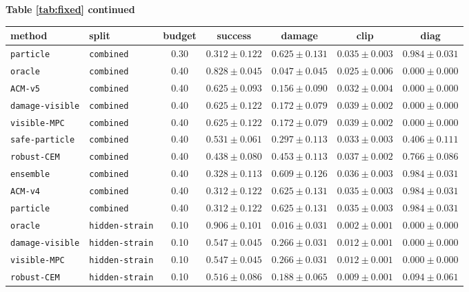 \documentclass{article}
\begin{document}
\begin{center}
\textbf{Table \ref{tab:fixed} continued}\\[0.4ex]
\begin{tabular}{llccccc}
\toprule
method & split & budget & success & damage & clip & diag \\
\midrule
\texttt{particle} & \texttt{combined} & 0.30 & $0.312 \pm 0.122$ & $0.625 \pm 0.131$ & $0.035 \pm 0.003$ & $0.984 \pm 0.031$ \\
\texttt{oracle} & \texttt{combined} & 0.40 & $0.828 \pm 0.045$ & $0.047 \pm 0.045$ & $0.025 \pm 0.006$ & $0.000 \pm 0.000$ \\
\texttt{ACM-v5} & \texttt{combined} & 0.40 & $0.625 \pm 0.093$ & $0.156 \pm 0.090$ & $0.032 \pm 0.004$ & $0.000 \pm 0.000$ \\
\texttt{damage-visible} & \texttt{combined} & 0.40 & $0.625 \pm 0.122$ & $0.172 \pm 0.079$ & $0.039 \pm 0.002$ & $0.000 \pm 0.000$ \\
\texttt{visible-MPC} & \texttt{combined} & 0.40 & $0.625 \pm 0.122$ & $0.172 \pm 0.079$ & $0.039 \pm 0.002$ & $0.000 \pm 0.000$ \\
\texttt{safe-particle} & \texttt{combined} & 0.40 & $0.531 \pm 0.061$ & $0.297 \pm 0.113$ & $0.033 \pm 0.003$ & $0.406 \pm 0.111$ \\
\texttt{robust-CEM} & \texttt{combined} & 0.40 & $0.438 \pm 0.080$ & $0.453 \pm 0.113$ & $0.037 \pm 0.002$ & $0.766 \pm 0.086$ \\
\texttt{ensemble} & \texttt{combined} & 0.40 & $0.328 \pm 0.113$ & $0.609 \pm 0.126$ & $0.036 \pm 0.003$ & $0.984 \pm 0.031$ \\
\texttt{ACM-v4} & \texttt{combined} & 0.40 & $0.312 \pm 0.122$ & $0.625 \pm 0.131$ & $0.035 \pm 0.003$ & $0.984 \pm 0.031$ \\
\texttt{particle} & \texttt{combined} & 0.40 & $0.312 \pm 0.122$ & $0.625 \pm 0.131$ & $0.035 \pm 0.003$ & $0.984 \pm 0.031$ \\
\texttt{oracle} & \texttt{hidden-strain} & 0.10 & $0.906 \pm 0.101$ & $0.016 \pm 0.031$ & $0.002 \pm 0.001$ & $0.000 \pm 0.000$ \\
\texttt{damage-visible} & \texttt{hidden-strain} & 0.10 & $0.547 \pm 0.045$ & $0.266 \pm 0.031$ & $0.012 \pm 0.001$ & $0.000 \pm 0.000$ \\
\texttt{visible-MPC} & \texttt{hidden-strain} & 0.10 & $0.547 \pm 0.045$ & $0.266 \pm 0.031$ & $0.012 \pm 0.001$ & $0.000 \pm 0.000$ \\
\texttt{robust-CEM} & \texttt{hidden-strain} & 0.10 & $0.516 \pm 0.086$ & $0.188 \pm 0.065$ & $0.009 \pm 0.001$ & $0.094 \pm 0.061$ \\

\end{tabular}
\end{center}
\end{document}
